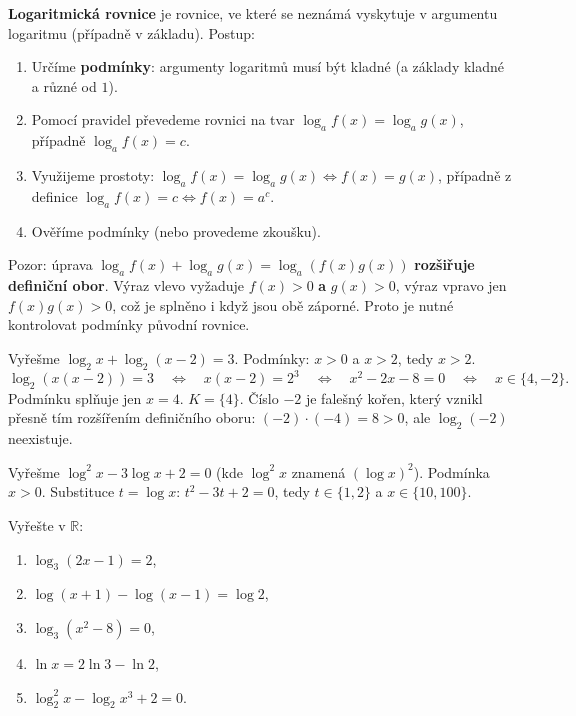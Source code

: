 \begin{definitionbox}
  \textbf{Logaritmická rovnice} je rovnice, ve které se neznámá vyskytuje v argumentu logaritmu (případně v základu). Postup:
  \begin{enumerate}
    \item Určíme \textbf{podmínky}: argumenty logaritmů musí být kladné (a základy kladné a různé od $1$).
    \item Pomocí pravidel převedeme rovnici na tvar $\log_a f(x) = \log_a g(x)$, případně $\log_a f(x) = c$.
    \item Využijeme prostoty: $\log_a f(x) = \log_a g(x)\Leftrightarrow f(x) = g(x)$, případně z definice $\log_a f(x) = c\Leftrightarrow f(x) = a^c$.
    \item Ověříme podmínky (nebo provedeme zkoušku).
  \end{enumerate}
\end{definitionbox}

Pozor: úprava $\log_a f(x) + \log_a g(x) = \log_a(f(x)g(x))$ \textbf{rozšiřuje definiční obor}. Výraz vlevo vyžaduje $f(x) > 0$ \textbf{a} $g(x) > 0$, výraz vpravo jen $f(x)g(x) > 0$, což je splněno i když jsou obě záporné. Proto je nutné kontrolovat podmínky původní rovnice.

\begin{example}
  Vyřešme $\log_2 x + \log_2(x - 2) = 3$. Podmínky: $x > 0$ a $x > 2$, tedy $x > 2$.
  \begin{equation*}
    \log_2\left(x(x - 2)\right) = 3\quad\Leftrightarrow\quad x(x - 2) = 2^3\quad\Leftrightarrow\quad x^2 - 2x - 8 = 0\quad\Leftrightarrow\quad x\in\{4, -2\}.
  \end{equation*}
  Podmínku splňuje jen $x = 4$. $K = \{4\}$. Číslo $-2$ je falešný kořen, který vznikl přesně tím rozšířením definičního oboru: $(-2)\cdot(-4) = 8 > 0$, ale $\log_2(-2)$ neexistuje.
\end{example}

\begin{example}
  Vyřešme $\log^2 x - 3\log x + 2 = 0$ (kde $\log^2 x$ znamená ${(\log x)}^2$). Podmínka $x > 0$. Substituce $t = \log x$: $t^2 - 3t + 2 = 0$, tedy $t\in\{1, 2\}$ a $x\in\{10, 100\}$.
\end{example}

\begin{problem}
  Vyřešte v $\mathbb{R}$:
  \begin{enumerate}[label=(\alph*)]
    \item $\log_3(2x - 1) = 2$,
    \item $\log(x + 1) - \log(x - 1) = \log 2$,
    \item $\log_3(x^2 - 8) = 0$,
    \item $\ln x = 2\ln 3 - \ln 2$,
    \item $\log_2^2 x - \log_2 x^3 + 2 = 0$.
  \end{enumerate}
\end{problem}


